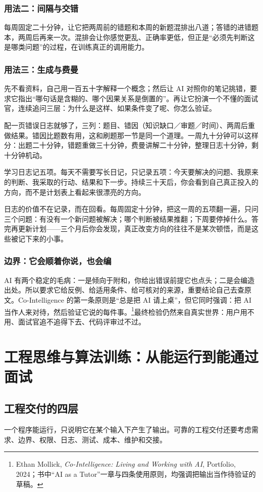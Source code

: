 \documentclass[UTF8,zihao=5,openany]{ctexbook}
\begin{document}
\subsection{用法二：间隔与交错}
每周固定二十分钟，让它把两周前的错题和本周的新题混排出八道；答错的进错题本，两周后再来一次。混排会让你感觉更乱、正确率更低，但正是“必须先判断这是哪类问题”的过程，在训练真正的调用能力。

\subsection{用法三：生成与费曼}
先不看资料，自己用一百五十字解释一个概念；然后让 AI 对照你的笔记挑错，要求它指出“哪句话是含糊的、哪个因果关系是倒置的”。再让它扮演一个不懂的面试官，连续追问三层：为什么是这样、如果条件变了呢、你怎么验证。

配一页错误日志就够了，三列：题目、错因（知识缺口／审题／时间）、两周后重做结果。错因比题数有用，这和刷题那一节是同一个道理。一周九十分钟可以这样分：出题二十分钟，错题重做三十分钟，费曼讲解二十分钟，整理日志十分钟，剩十分钟机动。


学习日志记五项。每天不需要写长日记，只记录五项：今天要解决的问题、我原来的判断、我采取的行动、结果和下一步。持续三十天后，你会看到自己真正投入的方向，而不是计划表上看起来很漂亮的方向。

日志的价值不在记录，而在回看。每周固定十分钟，把这一周的五项翻一遍，只问三个问题：有没有一个新问题被解决；哪个判断被结果推翻；下周要停掉什么。答完再更新计划——三个月后你会发现，真正改变方向的往往不是某次顿悟，而是这些被记下来的小事。
\subsection{边界：它会顺着你说，也会编}
AI 有两个稳定的毛病：一是倾向于附和，你给出错误前提它也点头；二是会编造出处。所以要求它给反例、给适用条件、给可核对的来源，重要结论自己去查原文。Co-Intelligence 的第一条原则是“总是把 AI 请上桌”，但它同时强调：把 AI 当作人来对待，然后验证它说的每件事。\footnote{Ethan Mollick, \emph{Co-Intelligence: Living and Working with AI}, Portfolio, 2024；书中“AI as a Tutor”一章与四条使用原则，均强调把输出当作待验证的草稿。}最终检验仍然来自真实世界：用户用不用、面试官追不追得下去、代码评审过不过。

\chapter{工程思维与算法训练：从能运行到能通过面试}
\section{工程交付的四层}
一个程序能运行，只说明它在某个输入下产生了输出。可靠的工程交付还要考虑需求、边界、权限、日志、测试、成本、维护和交接。
\end{document}
